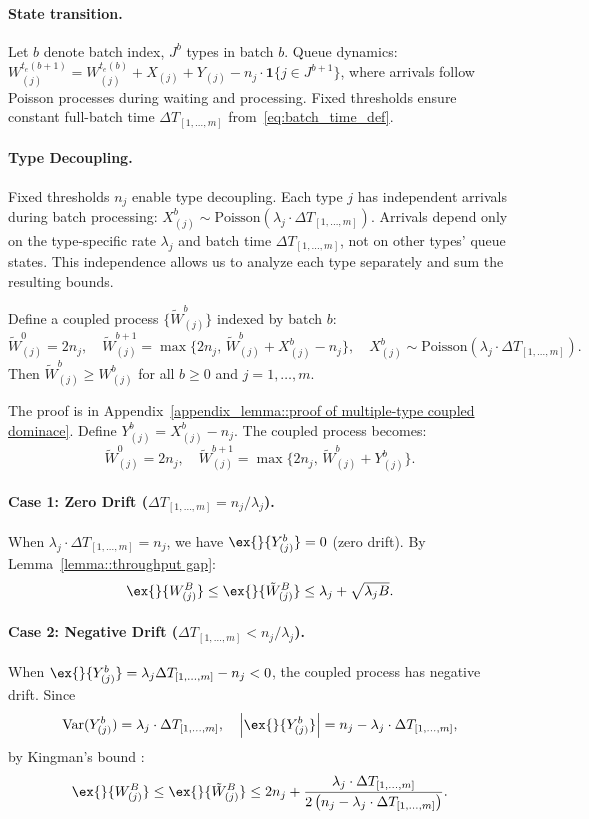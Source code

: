 \paragraph{State transition.} Let $b$ denote batch index, $J^b$ types in batch $b$. Queue dynamics: $W_{(j)}^{t_e(b+1)}=W_{(j)}^{t_e(b)}+X_{(j)}+Y_{(j)}- n_j\cdot \mathbf{1}\{j\in J^{b+1}\}$, where arrivals follow Poisson processes during waiting and processing. Fixed thresholds ensure constant full-batch time $\Delta T_{[1,\ldots,m]}$ from~\eqref{eq:batch_time_def}.

\paragraph{Type Decoupling.}
Fixed thresholds $n_j$ enable type decoupling. Each type $j$ has independent arrivals during batch processing: $X^b_{(j)} \sim \text{Poisson}(\lambda_j \cdot \Delta T_{[1,\ldots,m]})$. Arrivals depend only on the type-specific rate $\lambda_j$ and batch time $\Delta T_{[1,\ldots,m]}$, not on other types' queue states. This independence allows us to analyze each type separately and sum the resulting bounds.

\begin{lemma}\label{lemma::multiple-type coupled dominace}
Define a coupled process $\{\tilde{W}^b_{(j)}\}$ indexed by batch $b$:
$$\tilde{W}_{(j)}^0=2n_j, \quad \tilde{W}_{(j)}^{b+1}= \max\{ 2n_j,\, \tilde{W}_{(j)}^b +X_{(j)}^b-n_j \},\quad X^b_{(j)} \sim \text{Poisson}(\lambda_j\cdot \Delta T_{[1,\ldots,m]}).$$
Then $\tilde{W}^b_{(j)}\geq W^b_{(j)}$ for all $b\geq 0$ and $j=1,\ldots,m$.
\end{lemma}
\noindent The proof is in Appendix~\ref{appendix_lemma::proof of multiple-type coupled dominace}. Define $Y^b_{(j)} = X^b_{(j)} - n_j$. The coupled process becomes:
$$\tilde{W}^0_{(j)} = 2n_j,\quad \tilde{W}^{b+1}_{(j)} = \max\{ 2n_j, \, \tilde{W}^b_{(j)}+Y^b_{(j)} \}.$$

\paragraph{Case 1: Zero Drift ($\Delta T_{[1,\ldots,m]} = n_j/\lambda_j$).} When $\lambda_j\cdot \Delta T_{[1,\ldots,m]} = n_j$, we have $\ex{}{Y^b_{(j)}}=0$ (zero drift). By Lemma~\ref{lemma::throughput gap}:
$$\ex{}{W^B_{(j)}}\leq \ex{}{\tilde{W}^B_{(j)}}\leq \lambda_j + \sqrt{\lambda_j B}.$$

\paragraph{Case 2: Negative Drift ($\Delta T_{[1,\ldots,m]} < n_j/\lambda_j$).} When $\ex{}{Y^b_{(j)}}= \lambda_j \Delta T_{[1,\ldots,m]} - n_j <0$, the coupled process has negative drift. Since
$$\text{Var}(Y^b_{(j)}) = \lambda_j \cdot \Delta T_{[1,\ldots,m]},\quad
\left| \ex{}{Y^b_{(j)}} \right| = n_j - \lambda_j\cdot \Delta T_{[1,\ldots,m]},$$
by Kingman's bound \citep{kingman1962queues}:
$$\ex{}{W^B_{(j)}}\leq \ex{}{\tilde{W}^B_{(j)}}\leq 2n_j+ \frac{\lambda_j \cdot \Delta T_{[1,\ldots,m]}}{2\left(n_j - \lambda_j\cdot \Delta T_{[1,\ldots,m]}\right)}.$$

